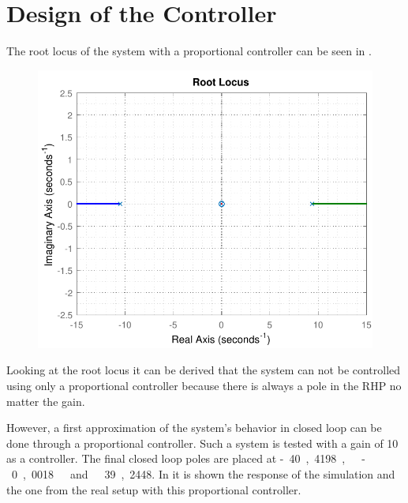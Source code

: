 \section{Design of the Controller}\label{designController}

The root locus of the system with a proportional controller can be seen in .

\begin{figure}[H]
	\centering 
	\includegraphics[scale=.75]{figures/rlocusCubli}
	\label{rlocusCubli2}
\end{figure}

Looking at the root locus it can be derived that the system can not be controlled using only a proportional controller because there is always a pole in the RHP no matter the gain.

However, a first approximation of the system's behavior in closed loop can be done through a proportional controller. Such a system is tested with a gain of 10 as a controller. The final closed loop poles are placed at \si{-40,4198,\ -0,0018\ and\ 39,2448}. In  it is shown the response of the simulation and the one from the real setup with this proportional controller.

